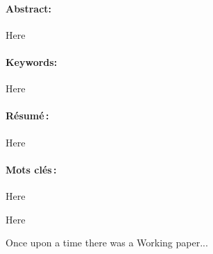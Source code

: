 \documentclass[gdplain]{geradwp}
\begin{document}
	
	
	\GDpageCouverture
	
	\begin{GDpagetitre}
		
		\begin{GDauthlist}
		\end{GDauthlist}
		
		\begin{GDaffillist}
		\end{GDaffillist}
	
		\begin{GDemaillist}
		\end{GDemaillist}
	
	\end{GDpagetitre}


	\GDabstract
	
	\paragraph{Abstract: }
	Here
	
	\paragraph{Keywords: }
	Here
	\vspace*{2cm}
	
	
	\paragraph{R\'esum\'e\,: }
	Here
	
	\paragraph{Mots cl\'es\,: }
	Here
	
	\GDacknowledgements
	Here
	
	\GDwpstart
	
	Once upon a time there was a Working paper...
\end{document}
